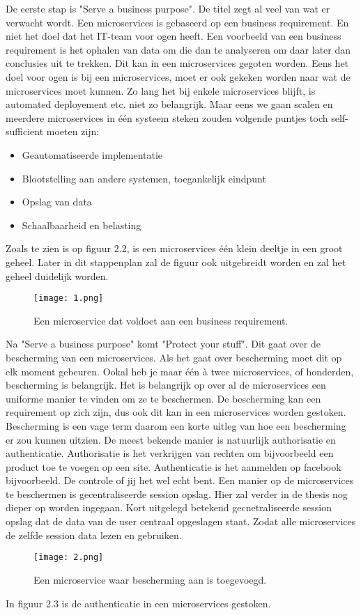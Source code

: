 De eerste stap is "Serve a business purpose". De titel zegt al veel van wat er verwacht wordt. Een microservices is gebaseerd op een business requirement. En niet het doel dat het IT-team voor ogen heeft. Een voorbeeld van een business requirement is het ophalen van data om die dan te analyseren om daar later dan conclusies uit te trekken. Dit kan in een microservices gegoten worden. Eens het doel voor ogen is bij een microservices, moet er ook gekeken worden naar wat de microservices moet kunnen. Zo lang het bij enkele microservices blijft, is automated deployement etc. niet zo belangrijk. Maar eens we gaan scalen en meerdere microservices in één systeem steken zouden volgende puntjes toch self-sufficient moeten zijn:
\begin{itemize}
	\item Geautomatiseerde implementatie
	\item Blootstelling aan andere systemen, toegankelijk eindpunt
	\item Opslag van data
	\item Schaalbaarheid en belasting
\end{itemize}
Zoals te zien is op figuur 2.2, is een microservices één klein deeltje in een groot geheel. Later in dit stappenplan zal de figuur ook uitgebreidt worden en zal het geheel duidelijk worden. 
\begin{figure}[h]
	\texttt{[image: 1.png]}
	\caption{Een microservice dat voldoet aan een business requirement. \textcite{Benetis2016}}
	\centering
\end{figure}

Na "Serve a business purpose" komt "Protect your stuff". Dit gaat over de bescherming van een microservices. Als het gaat over bescherming moet dit op elk moment gebeuren. Ookal heb je maar één à twee microservices, of honderden, bescherming is belangrijk. Het is belangrijk op over al de microservices een uniforme manier te vinden om ze te beschermen. De bescherming kan een requirement op zich zijn, dus ook dit kan in een microservices worden gestoken. Bescherming is een vage term daarom een korte uitleg van hoe een bescherming er zou kunnen uitzien. De meest bekende manier is natuurlijk authorisatie en authenticatie. Authorisatie is het verkrijgen van rechten om bijvoorbeeld een product toe te voegen op een site. Authenticatie is het aanmelden op facebook bijvoorbeeld. De controle of jij het wel echt bent. Een manier op de microservices te beschermen is gecentraliseerde session opslag. Hier zal verder in de thesis nog dieper op worden ingegaan. Kort uitgelegd betekend gecnetraliseerde session opslag dat de data van de user centraal opgeslagen staat. Zodat alle microservices de zelfde session data lezen en gebruiken. 
\begin{figure}[h]
	\texttt{[image: 2.png]}
	\caption{Een microservice waar bescherming aan is toegevoegd. \textcite{Benetis2016}}
	\centering
\end{figure}
In figuur 2.3 is de authenticatie in een microservices gestoken. 

